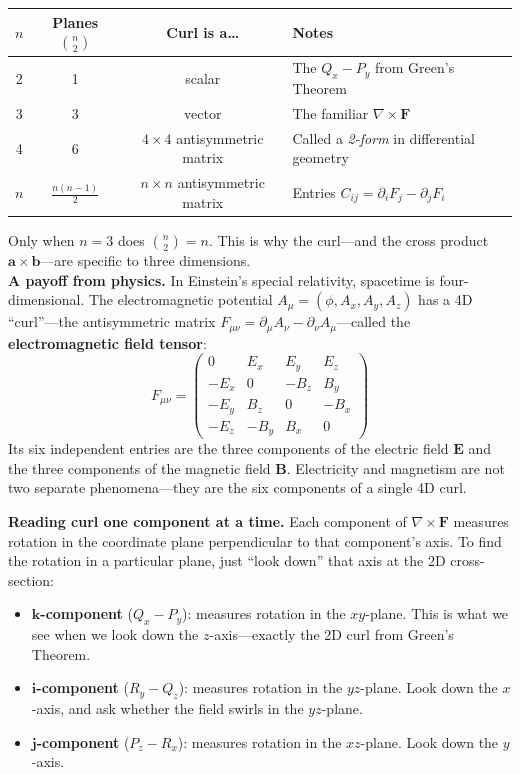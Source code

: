 \begin{center}
\begin{tabular}{c|c|c|l}
\toprule
$n$ & Planes $\binom{n}{2}$ & \textbf{Curl is a\ldots} & \textbf{Notes} \\
\midrule
2 & 1 & scalar & The $Q_x - P_y$ from Green's Theorem \\
3 & 3 & vector & The familiar $\nabla \times \mathbf{F}$ \\
4 & 6 & $4\times 4$ antisymmetric matrix & Called a \textit{2-form} in differential geometry \\
$n$ & $\frac{n(n-1)}{2}$ & $n\times n$ antisymmetric matrix & Entries $C_{ij} = \partial_i F_j - \partial_j F_i$ \\
\bottomrule
\end{tabular}
\end{center}

\noindent Only when $n = 3$ does $\binom{n}{2} = n$. This is why the curl---and the cross product $\mathbf{a} \times \mathbf{b}$---are specific to three dimensions. \\

\noindent \textbf{A payoff from physics.} In Einstein's special relativity, spacetime is four-dimensional. The electromagnetic potential $A_\mu = (\phi, A_x, A_y, A_z)$ has a 4D ``curl''---the antisymmetric matrix $F_{\mu\nu} = \partial_\mu A_\nu - \partial_\nu A_\mu$---called the \textbf{electromagnetic field tensor}:
\[
F_{\mu\nu} = \begin{pmatrix}
0 & E_x & E_y & E_z \\
-E_x & 0 & -B_z & B_y \\
-E_y & B_z & 0 & -B_x \\
-E_z & -B_y & B_x & 0
\end{pmatrix}
\]
Its six independent entries are the three components of the electric field $\mathbf{E}$ and the three components of the magnetic field $\mathbf{B}$. Electricity and magnetism are not two separate phenomena---they are the six components of a single 4D curl.

\bigskip

\noindent \textbf{Reading curl one component at a time.} Each component of $\nabla\times\mathbf{F}$ measures rotation in the coordinate plane perpendicular to that component's axis. To find the rotation in a particular plane, just ``look down'' that axis at the 2D cross-section:

\begin{itemize}
    \item \textbf{$\mathbf{k}$-component} ($Q_x - P_y$): measures rotation in the $xy$-plane. This is what we see when we look down the $z$-axis---exactly the 2D curl from Green's Theorem.
    \item \textbf{$\mathbf{i}$-component} ($R_y - Q_z$): measures rotation in the $yz$-plane. Look down the $x$-axis, and ask whether the field swirls in the $yz$-plane.
    \item \textbf{$\mathbf{j}$-component} ($P_z - R_x$): measures rotation in the $xz$-plane. Look down the $y$-axis.
\end{itemize}

